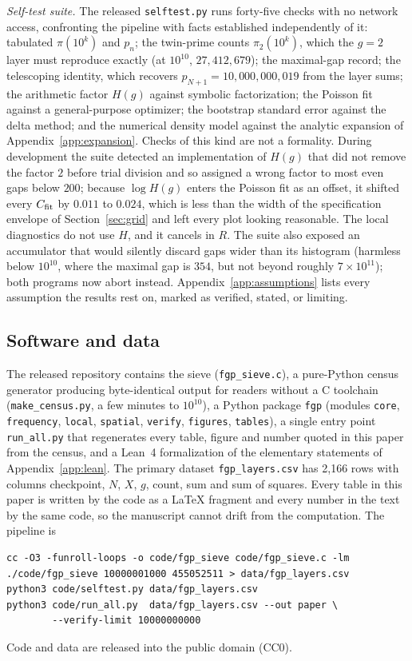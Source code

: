 \documentclass[11pt,a4paper]{article}
\begin{document}
\emph{Self-test suite.} The released \texttt{selftest.py} runs forty-five checks with no network access, confronting the pipeline with facts established independently of it: tabulated $\pi(10^k)$ and $p_n$; the twin-prime counts $\pi_2(10^k)$, which the $g=2$ layer must reproduce exactly (at $10^{10}$, $27{,}412{,}679$); the maximal-gap record; the telescoping identity, which recovers $p_{N+1}=10{,}000{,}000{,}019$ from the layer sums; the arithmetic factor $H(g)$ against symbolic factorization; the Poisson fit against a general-purpose optimizer; the bootstrap standard error against the delta method; and the numerical density model against the analytic expansion of Appendix~\ref{app:expansion}. Checks of this kind are not a formality. During development the suite detected an implementation of $H(g)$ that did not remove the factor $2$ before trial division and so assigned a wrong factor to most even gaps below $200$; because $\log H(g)$ enters the Poisson fit as an offset, it shifted every $C_{\mathrm{fit}}$ by $0.011$ to $0.024$, which is less than the width of the specification envelope of Section~\ref{sec:grid} and left every plot looking reasonable. The local diagnostics do not use $H$, and it cancels in $R$. The suite also exposed an accumulator that would silently discard gaps wider than its histogram (harmless below $10^{10}$, where the maximal gap is $354$, but not beyond roughly $7\times10^{11}$); both programs now abort instead. Appendix~\ref{app:assumptions} lists every assumption the results rest on, marked as verified, stated, or limiting.

\subsection{Software and data}

The released repository contains the sieve (\texttt{fgp\_sieve.c}), a pure-Python census generator producing byte-identical output for readers without a C toolchain (\texttt{make\_census.py}, a few minutes to $10^{10}$), a Python package \texttt{fgp} (modules \texttt{core}, \texttt{frequency}, \texttt{local}, \texttt{spatial}, \texttt{verify}, \texttt{figures}, \texttt{tables}), a single entry point \texttt{run\_all.py} that regenerates every table, figure and number quoted in this paper from the census, and a Lean~4 formalization of the elementary statements of Appendix~\ref{app:lean}. The primary dataset \texttt{fgp\_layers.csv} has 2{,}166 rows with columns checkpoint, $N$, $X$, $g$, count, sum and sum of squares. Every table in this paper is written by the code as a LaTeX fragment and every number in the text by the same code, so the manuscript cannot drift from the computation. The pipeline is
\begin{lstlisting}[basicstyle=\ttfamily\footnotesize,columns=fullflexible]
cc -O3 -funroll-loops -o code/fgp_sieve code/fgp_sieve.c -lm
./code/fgp_sieve 10000001000 455052511 > data/fgp_layers.csv
python3 code/selftest.py data/fgp_layers.csv
python3 code/run_all.py  data/fgp_layers.csv --out paper \
        --verify-limit 10000000000
\end{lstlisting}
Code and data are released into the public domain (CC0).
\end{document}
